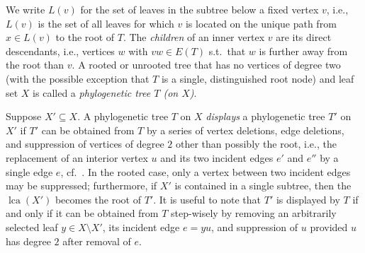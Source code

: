 \documentclass[smallextended]{svjour3}
\let\cite\citep
\newcommand{\rev}[1]{\begingroup\color{blue}#1\endgroup}
\newcommand{\lca}[1]{\mathop{lca}(#1)}
\begin{document}
We write $L(v)$ for the set of leaves in the subtree below a fixed vertex
$v$, i.e., $L(v)$ is the set of all leaves for which $v$ is located on the
unique path from $x\in L(v)$ to the root of $T$. The \emph{children} of an
inner vertex $v$ are its direct descendants, i.e., vertices $w$ with $vw\in
E(T)$ s.t.\ that $w$ is further away from the root than $v$.  A rooted or
unrooted tree that has no vertices of degree two (with the possible
exception that $T$ is a single, distinguished root node) and leaf set $X$
is called a \emph{phylogenetic tree $T$ (on $X$)}.

Suppose $X'\subseteq X$. A phylogenetic tree $T$ on $X$ \emph{displays} a
phylogenetic tree $T'$ on $X'$ if $T'$ can be obtained from $T$ by a series
of vertex deletions, edge deletions, and suppression of vertices of degree
$2$ other than possibly the root, i.e., the replacement of an interior
vertex $u$ and its two incident edges $e'$ and $e''$ by a single edge $e$,
cf.\ \cite[Def.\ 6.1.2]{sem-ste-03a}. In the rooted case, only a vertex
between two 
\rev{incident} edges 
may be suppressed;
furthermore, if $X'$ is contained in a single subtree, then the $\lca{X'}$
becomes the root of $T'$. It is useful to note that $T'$ is displayed by
$T$ if and only if it can be obtained from $T$ step-wisely by removing an
arbitrarily selected leaf $y\in X\setminus X'$, its incident edge $e=yu$,
and suppression of $u$ provided $u$ has degree $2$ after removal of $e$.
\end{document}
